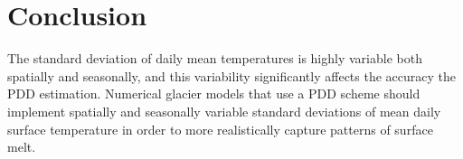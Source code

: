 \documentclass[twocolumn]{igs}
\begin{document}

\section{Conclusion}

The standard deviation of daily mean temperatures is highly variable both spatially and seasonally, and this variability significantly affects the accuracy the PDD estimation. Numerical glacier models that use a PDD scheme should implement spatially and seasonally variable standard deviations of mean daily surface temperature in order to more realistically capture patterns of surface melt.



\end{document}
